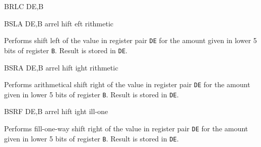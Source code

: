 \begin{basedescript}{
    \desclabelstyle{\multilinelabel}
    \desclabelwidth{3cm}}
\begin{DetailItem}{BRLC DE,B\ZXN}
        \begin{DetailTiming}
        \end{DetailTiming}

    \end{DetailItem}

    \begin{DetailItem}{BSLA DE,B\ZXN}
        {arrel hift eft rithmetic}
        {\SymBSLA}

        Performs shift left of the value in register pair {\tt DE} for the amount given in lower 5 bits of register {\tt B}. Result is stored in {\tt DE}.

        \begin{DetailEffects}
            \FlagsBSLA
        \end{DetailEffects}
		
        \begin{DetailTiming}
        \end{DetailTiming}

    \end{DetailItem}

    \begin{DetailItem}{BSRA DE,B\ZXN}
        {arrel hift ight rithmetic}
        {\SymBSRA}

        Performs arithmetical shift right of the value in register pair {\tt DE} for the amount given in lower 5 bits of register {\tt B}. Result is stored in {\tt DE}.

        \begin{DetailEffects}
            \FlagsBSRA
        \end{DetailEffects}
		
        \begin{DetailTiming}
        \end{DetailTiming}

    \end{DetailItem}

    \begin{DetailItem}{BSRF DE,B\ZXN}
        {arrel hift ight ill-one}
        {\SymBSRF}

        Performs fill-one-way shift right of the value in register pair {\tt DE} for the amount given in lower 5 bits of register {\tt B}. Result is stored in {\tt DE}.

        \begin{DetailEffects}
            \FlagsBSRF
        \end{DetailEffects}
		

\end{DetailItem}
\end{basedescript}
